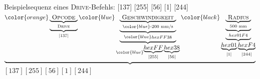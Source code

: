 \begin{beispiel}{Beispielsequenz eines \textsc{Drive}-Befehls: [137] [255] [56] [1] [244]} \\
\centering
\(
\underbrace{\color{orange}\underbrace{\underbrace{\text{\textsc{ Opcode }}}_{\substack{\text{\textsc{Drive}}}}}_{\substack{\text{\textsc{|137|}}}}
\color{blue}\underbrace{\underbrace{\underbrace{\text{\textsc{ Geschwindigkeit }}}_{\color{blue}\substack{\text{-200 mm/s}}}}_{\color{blue}\substack{hex FF38}}}_{\color{blue}\substack{\underbrace{hex FF}_{\substack{|255|}}\underbrace{hex 38}_{\substack{|56|}}}}\color{black}\underbrace{\underbrace{\underbrace{\text{\textsc{ Radius }}}_{\substack{\text{500 mm}}}}_{\substack{hex 01F4}}}_{\substack{\underbrace{hex 01}_{\substack{|1|}}\underbrace{hex F4}_{\substack{|244|}}}}} \)\\
\( [137] [255] [56] [1] [244] \)

\label{exa:drive}
\end{beispiel}


